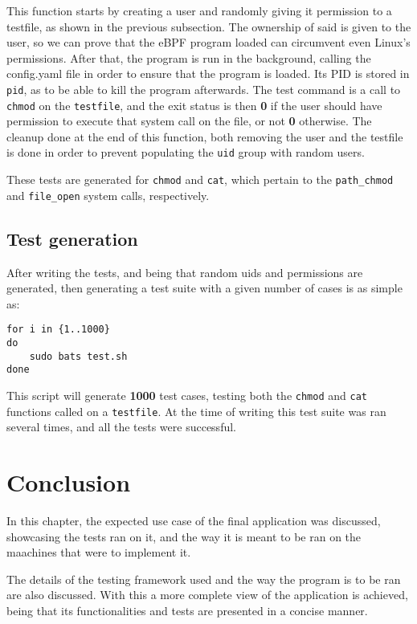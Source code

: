 This function starts by creating a user and randomly giving it permission to a testfile, as shown in the previous subsection. The ownership of said is given to the user, so we can prove that the eBPF program loaded can circumvent even Linux's permissions.
After that, the program is run in the background, calling the config.yaml file in order to ensure that the program is loaded. Its PID is stored in \texttt{pid}, as to be able to kill the program afterwards.
The test command is a call to \texttt{chmod} on the \texttt{testfile}, and the exit status is then \textbf{0} if the user should have permission to execute that system call on the file, or not \textbf{0} otherwise.
The cleanup done at the end of this function, both removing the user and the testfile is done in order to prevent populating the \texttt{uid} group with random users.

These tests are generated for \texttt{chmod} and \texttt{cat}, which pertain to the \texttt{path\_chmod} and \texttt{file\_open} system calls, respectively.

\subsection{Test generation}
After writing the tests, and being that random uids and permissions are generated, then generating a test suite with a given number of cases is as simple as:

\begin{lstlisting}
for i in {1..1000}
do 
    sudo bats test.sh
done
\end{lstlisting}

This script will generate \textbf{1000} test cases, testing both the \texttt{chmod} and \texttt{cat} functions called on a \texttt{testfile}. At the time of writing this test suite was ran several times, and all the tests were successful.

\section{Conclusion}
In this chapter, the expected use case of the final application was discussed, showcasing the tests ran on it, and the way it is meant to be ran on the maachines that were to implement it.

The details of the testing framework used and the way the program is to be ran are also discussed. With this a more complete view of the application is achieved, being that its functionalities and tests are presented in a concise manner.
